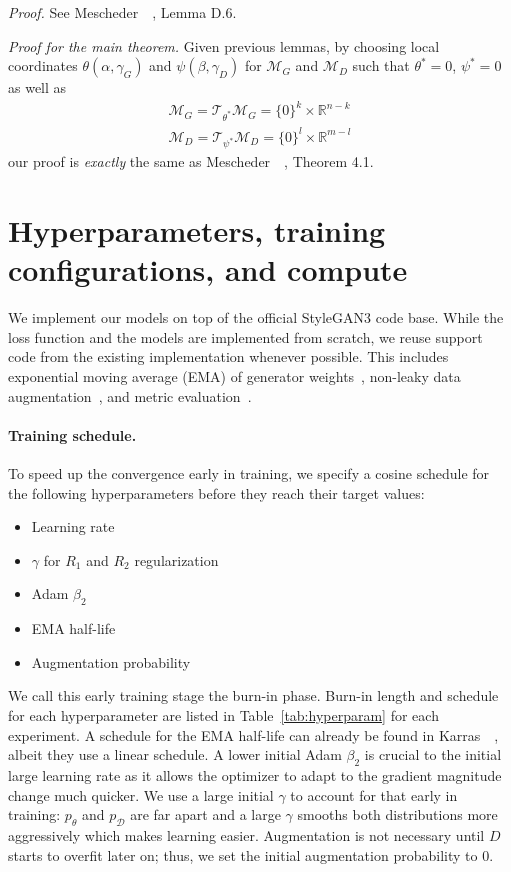 \emph{Proof.} See Mescheder~\etal~\cite{r1}, Lemma D.6.

\emph{Proof for the main theorem.} Given previous lemmas, by choosing local coordinates $\theta(\alpha,\gamma_G)$ and $\psi(\beta,\gamma_D)$ for $\mathcal{M}_G$ and $\mathcal{M}_D$ such that $\theta^*=0$, $\psi^*=0$ as well as
\begin{align}
\mathcal{M}_G=\mathcal{T}_{\theta^*}\mathcal{M}_G=\{0\}^k\times\mathbb{R}^{n-k} \\
\mathcal{M}_D=\mathcal{T}_{\psi^*}\mathcal{M}_D=\{0\}^l\times\mathbb{R}^{m-l}
\end{align}
our proof is \emph{exactly} the same as Mescheder~\etal~\cite{r1}, Theorem 4.1.

\newpage
\section{Hyperparameters, training configurations, and compute}
We implement our models on top of the official StyleGAN3 code base. While the loss function and the models are implemented from scratch, we reuse support code from the existing implementation whenever possible. This includes exponential moving average (EMA) of generator weights~\cite{pggan}, non-leaky data augmentation~\cite{sg2ada}, and metric evaluation~\cite{sg3}.

\vspace{-0.1cm}
\paragraph{Training schedule.}
To speed up the convergence early in training, we specify a cosine schedule for the following hyperparameters before they reach their target values: 
\begin{itemize}[parsep=2pt,topsep=0pt,itemsep=0pt]
    \item Learning rate
    \item $\gamma$ for $R_1$ and $R_2$ regularization
    \item Adam $\beta_2$
    \item EMA half-life
    \item Augmentation probability
\end{itemize}
We call this early training stage the burn-in phase. Burn-in length and schedule for each hyperparameter are listed in Table~\ref{tab:hyperparam} for each experiment. A schedule for the EMA half-life can already be found in Karras~\etal~\cite{sg2ada}, albeit they use a linear schedule. A lower initial Adam $\beta_2$ is crucial to the initial large learning rate as it allows the optimizer to adapt to the gradient magnitude change much quicker. We use a large initial $\gamma$ to account for that early in training: $p_\theta$ and $p_\mathcal{D}$ are far apart and a large $\gamma$ smooths both distributions more aggressively which makes learning easier. Augmentation is not necessary until $D$ starts to overfit later on; thus, we set the initial augmentation probability to 0.

